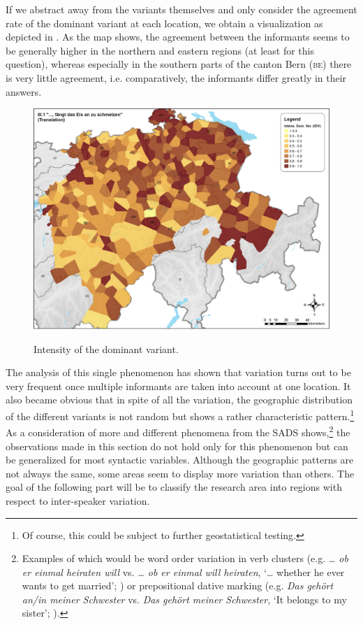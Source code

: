 \documentclass[output=paper]{LSP/langsci}
\begin{document}
If we abstract away from the variants themselves and only consider the agreement rate of the dominant variant at each location, we obtain a visualization as depicted in . As the map shows, the agreement between the informants seems to be generally higher in the northern and eastern regions (at least for this question), whereas especially in the southern parts of the canton Bern (\textsc{be}) there is very little agreement, i.e. comparatively, the informants differ greatly in their answers.
  
\begin{figure}
\includegraphics[width=\textwidth]{illustrations/stoeck_fig4}
\label{fig:4}
\caption{Intensity of the dominant variant.}
\end{figure}
 
The analysis of this single phenomenon has shown that variation turns out to be very frequent once multiple informants are taken into account at one location. It also became obvious that in spite of all the variation, the geographic distribution of the different variants is not random but shows a rather characteristic pattern.\footnote{ Of course, this could be subject to further geostatistical testing.} As a consideration of more and different phenomena from the SADS shows,\footnote{ Examples of which would be word order variation in verb clusters (e.g. \emph{… ob er einmal heiraten will} vs. \emph{… ob er einmal will heiraten}, ‘… whether he ever wants to get married’; \citealt{seiler_three_2004}) or prepositional dative marking (e.g. \emph{Das gehört an/in meiner Schwester} vs. \emph{Das gehört meiner Schwester}, ‘It belongs to my sister’; \citealt{seiler_prapositionale_2003}).} the observations made in this section do not hold only for this phenomenon but can be generalized for most syntactic variables. Although the geographic patterns are not always the same, some areas seem to display more variation than others. The goal of the following part will be to classify the research area into regions with respect to inter-speaker variation.
\end{document}
